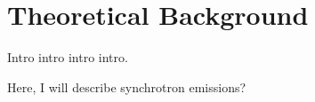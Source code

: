 \chapter{Theoretical Background}\label{chap:theory}
\begin{chapabstract}

Intro intro intro intro.

\end{chapabstract}

Here, I will describe synchrotron emissions?
